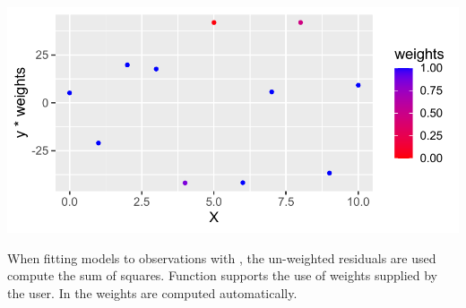 \documentclass[krantz2]{krantz}\usepackage{knitr}
\begin{document}
\begin{knitrout}\footnotesize
{}\color{fgcolor}\begin{kframe}
\begin{alltt}
 \hlopt{+}
  \hlstd{(}  \hlopt{~}  \hlstd{,}  \hlstd{=} \hlstd{),}
                      \hlstd{=} \hlstd{,}
                      \hlstd{=} \hlstd{(} 
                                    \hlstd{=} \hlstd{(} 
                                               \hlopt{*} 
                                    \hlstd{=} 
                      \hlstd{=} \hlstd{)} \hlopt{+}
  \hlstd{(} \hlstd{=} \hlstd{,}  \hlstd{=} \hlstd{,}  \hlstd{=} \hlstd{(}\hlstd{,} \hlstd{),}
                        \hlstd{=} \hlstd{)}
\end{alltt}
\end{kframe}

{\centering \includegraphics[width=.7\textwidth]{figure/pos-mapping-stage-03-1} 

}


\end{knitrout}

\begin{explainbox}
When fitting models to observations with , the un-weighted residuals are used compute the sum of squares. Function  supports the use of weights supplied by the user. In  the weights are computed automatically.
\end{explainbox}

\end{document}
